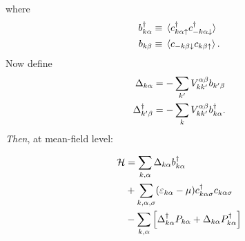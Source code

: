 where
\begin{align}
	b_{k\alpha}^{\dg}&\equiv \ev*{\cd_{k\alpha\uparrow}\cd_{-k\alpha\downarrow}} \\ 
	b_{k\beta} &\equiv \ev*{c_{-k\beta\downarrow}c_{k\beta\uparrow}}.
\end{align}
Now define
\begin{align}
	\Delta_{k\alpha} &= -\sum_{k'}V_{kk'}^{\alpha\beta}b_{k'\beta} \\
	\Delta_{k'\beta}^{\dagger} &= -\sum_{k}V_{kk'}^{\alpha\beta}b_{k\alpha}^{\dagger}.
\end{align}
\emph{Then}, at mean-field level: 
\begin{tcolorbox}
	\begin{equation}
		\begin{aligned}
			\mathcal{H} &= \sum_{k,\alpha}\Delta_{k\alpha}b_{k\alpha}^{\dagger} \\
			&+\sum_{k,\alpha, \sigma}(\varepsilon_{k\alpha}-\mu)c^{\dagger}_{k\alpha\sigma}c_{k\alpha\sigma} \\
			&- \sum_{k,\alpha}\left [\Delta_{k\alpha}^{\dagger}P_{k\alpha} + \Delta_{k\alpha}P_{k\alpha}^{\dagger}\right ]
		\end{aligned}
	\end{equation}
\end{tcolorbox}

